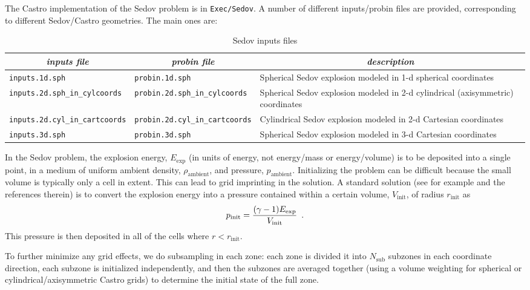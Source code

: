 The Castro implementation of the Sedov problem is in {\tt Exec/Sedov}.
A number of different inputs/probin files are provided, corresponding
to different Sedov/Castro geometries.  The main ones are:

\begin{table}[h]
\centering
{\small
\begin{tabular}{|l|l|p{2.25in}|} \hline
\multicolumn{1}{|c}{\em inputs file} &  \multicolumn{1}{|c}{\em probin file} & \multicolumn{1}{|c|}{\em description} \\
\hline
{\tt inputs.1d.sph} & {\tt probin.1d.sph} & Spherical Sedov explosion modeled in 1-d spherical coordinates \\[2mm]
%
{\tt inputs.2d.sph\_in\_cylcoords} & {\tt probin.2d.sph\_in\_cylcoords} & Spherical Sedov explosion modeled in 2-d cylindrical (axisymmetric) coordinates \\[2mm]
%
{\tt inputs.2d.cyl\_in\_cartcoords} & {\tt probin.2d.cyl\_in\_cartcoords} & Cylindrical Sedov explosion modeled in 2-d Cartesian coordinates \\[2mm]
%
{\tt inputs.3d.sph} & {\tt probin.3d.sph} & Spherical Sedov explosion modeled in 3-d Cartesian coordinates \\
\hline
\end{tabular}
\caption{\label{table:sedov_inputs} Sedov inputs files}
} %
\label{Table:Sod}
\end{table}

In the Sedov problem, the explosion energy, $E_\mathrm{exp}$ (in units 
of energy, not energy/mass or energy/volume)
is to be deposited into a single point, in a medium of uniform ambient
density, $\rho_\mathrm{ambient}$, and pressure, $p_\mathrm{ambient}$.
Initializing the problem can be difficult because the small volume is
typically only a cell in extent.  This can lead to grid imprinting in
the solution.  A standard solution (see for example \cite{omang:2006}
and the references therein)
is to convert the explosion energy into a pressure contained within a
certain volume, $V_\mathrm{init}$, of radius $r_\mathrm{init}$ as
\begin{equation}
p_\mathrm{init} = \frac{(\gamma - 1) E_\mathrm{exp}}{V_\mathrm{init}} \enskip .
\end{equation}
This pressure is then deposited in all of the cells where $r <
r_\mathrm{init}$.  

To further minimize any grid effects, we do subsampling
in each zone: each zone is divided it into $N_\mathrm{sub}$ subzones in each
coordinate direction, each subzone is initialized independently, and
then the subzones are averaged together (using a volume weighting for
spherical or cylindrical/axisymmetric Castro grids) to determine the
initial state of the full zone.

